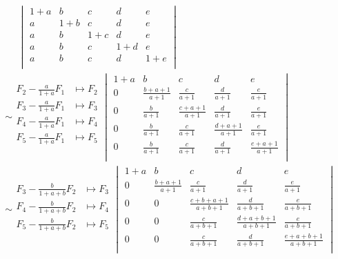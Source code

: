     \[
        \begin{aligned}
            &\phantom{\sim}
            \begin{vmatrix}
                1 + a & b & c & d & e \\
                a & 1 + b & c & d & e \\
                a & b & 1 + c & d & e \\
                a & b & c & 1 + d & e \\
                a & b & c & d & 1 + e \\
            \end{vmatrix}
            \\
            &\sim
            \begin{aligned}
                F_2 -\frac{a}{1 + a}F_1 &\mapsto F_2 \\
                F_3 -\frac{a}{1 + a}F_1 &\mapsto F_3 \\
                F_4 -\frac{a}{1 + a}F_1 &\mapsto F_4 \\
                F_5 -\frac{a}{1 + a}F_1 &\mapsto F_5 \\
            \end{aligned}
            \begin{vmatrix}
                1 + a & b & c & d & e \\
                0 & \frac{b + a + 1}{a + 1} & \frac{c}{a + 1} & \frac{d}{a + 1} & \frac{e}{a + 1} \\
                0 & \frac{b}{a + 1} & \frac{c + a + 1}{a + 1} & \frac{d}{a + 1} & \frac{e}{a + 1} \\
                0 & \frac{b}{a + 1} & \frac{c}{a + 1} & \frac{d + a + 1}{a + 1} & \frac{e}{a + 1} \\
                0 & \frac{b}{a + 1} & \frac{c}{a + 1} & \frac{d}{a + 1} & \frac{e + a + 1}{a + 1} \\
            \end{vmatrix}
            \\
            &\sim
            \begin{aligned}
                F_3 -\frac{b}{1 + a + b}F_2 &\mapsto F_3 \\
                F_4 -\frac{b}{1 + a + b}F_2 &\mapsto F_4 \\
                F_5 -\frac{b}{1 + a + b}F_2 &\mapsto F_5 \\
            \end{aligned}
            \begin{vmatrix}
                1 + a & b & c & d & e \\
                0 & \frac{b + a + 1}{a + 1} & \frac{c}{a + 1} & \frac{d}{a + 1} & \frac{e}{a + 1} \\
                0 & 0 & \frac{c + b + a + 1}{a + b + 1} & \frac{d}{a + b + 1} & \frac{e}{a+b+1} \\
                0 & 0 & \frac{c}{a + b + 1} & \frac{d + a + b + 1}{a + b + 1} & \frac{e}{a + b + 1} \\
                0 & 0 & \frac{c}{a + b + 1} & \frac{d}{a + b + 1} & \frac{e + a + b + 1}{a + b + 1} \\
            \end{vmatrix}
        \end{aligned}
    \]
